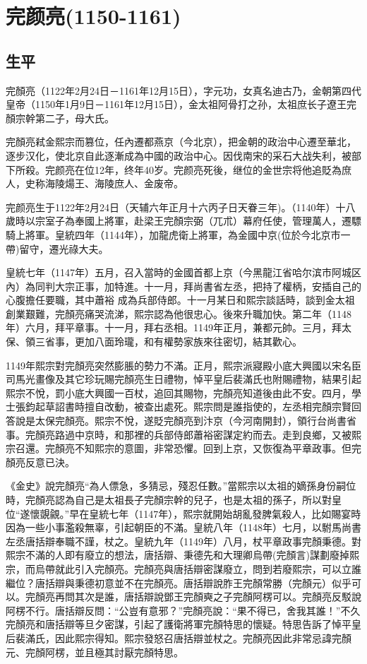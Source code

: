 
\section{完颜亮\tiny(1150-1161)}

\subsection{生平}

完顏亮（1122年2月24日－1161年12月15日），字元功，女真名迪古乃，金朝第四代皇帝（1150年1月9日－1161年12月15日），金太祖阿骨打之孙，太祖庶长子遼王完顏宗幹第二子，母大氏。

完顏亮弒金熙宗而篡位，任內遷都燕京（今北京），把金朝的政治中心遷至華北，逐步汉化，使北京自此逐漸成為中國的政治中心。因伐南宋的采石大战失利，被部下所殺。完颜亮在位12年，终年40岁。完颜亮死後，继位的金世宗将他追貶為庶人，史称海陵煬王、海陵庶人、金废帝。

完颜亮生于1122年2月24日（天辅六年正月十六丙子日天眷三年)。（1140年）十八歲時以宗室子為奉國上將軍，赴梁王完顏宗弼（兀朮）幕府任使，管理萬人，遷驃騎上將軍。皇統四年（1144年），加龍虎衛上將軍，為金國中京(位於今北京市一帶)留守，遷光祿大夫。

皇統七年（1147年）五月，召入當時的金國首都上京（今黑龍江省哈尔滨市阿城区內）為同判大宗正事，加特進。十一月，拜尚書省左丞，把持了權柄，安插自己的心腹擔任要職，其中蕭裕 成為兵部侍郎。十一月某日和熙宗談話時，談到金太祖創業艱難，完顏亮痛哭流涕，熙宗認為他很忠心。後來升職加快。第二年（1148年）六月，拜平章事。十一月，拜右丞相。1149年正月，兼都元帥。三月，拜太保、領三省事，更加八面玲瓏，和有權勢家族來往密切，結其歡心。

1149年熙宗對完顏亮突然膨脹的勢力不滿。正月，熙宗派寢殿小底大興國以宋名臣司馬光畫像及其它珍玩賜完顏亮生日禮物，悼平皇后裴滿氏也附賜禮物，結果引起熙宗不悅，罰小底大興國一百杖，追回其賜物，完顏亮知道後由此不安。四月，學士張鈞起草詔書時擅自改動，被查出處死。熙宗問是誰指使的，左丞相完顏宗賢回答說是太保完顏亮。熙宗不悅，遂貶完顏亮到汴京（今河南開封），領行台尚書省事。完顏亮路過中京時，和那裡的兵部侍郎蕭裕密謀定約而去。走到良鄉，又被熙宗召還。完顏亮不知熙宗的意圖，非常恐懼。回到上京，又恢復為平章政事。但完顏亮反意已決。

《金史》說完顏亮“為人僄急，多猜忌，殘忍任數。”當熙宗以太祖的嫡孫身份嗣位時，完顏亮認為自己是太祖長子完顏宗幹的兒子，也是太祖的孫子，所以對皇位“遂懷覬覦。”早在皇統七年（1147年），熙宗就開始胡亂發脾氣殺人，比如賜宴時因為一些小事濫殺無辜，引起朝臣的不滿。皇統八年（1148年）七月，以駙馬尚書左丞唐括辯奉職不謹，杖之。皇統九年（1149年）八月，杖平章政事完顏秉德。對熙宗不滿的人即有廢立的想法，唐括辯、秉德先和大理卿烏帶(完顏言)謀劃廢掉熙宗，而烏帶就此引入完顏亮。完顏亮與唐括辯密謀廢立，問到若廢熙宗，可以立誰繼位？唐括辯與秉德初意並不在完顏亮。唐括辯說胙王完顏常勝（完顏元）似乎可以。完顏亮再問其次是誰，唐括辯說鄧王完顏奭之子完顏阿楞可以。完顏亮反駁說阿楞不行。唐括辯反問：“公豈有意邪？”完顏亮說：“果不得已，舍我其誰！”不久完顏亮和唐括辯等旦夕密謀，引起了護衛將軍完顏特思的懷疑。特思告訴了悼平皇后裴滿氏，因此熙宗得知。熙宗發怒召唐括辯並杖之。完顏亮因此非常忌諱完顏元、完顏阿楞，並且極其討厭完顏特思。

